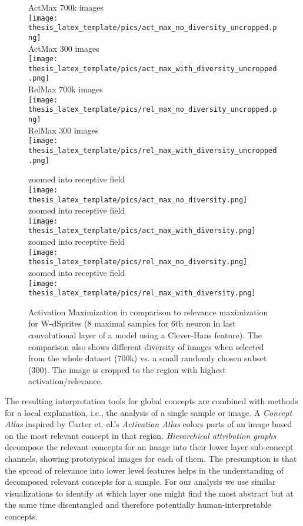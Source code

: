 \begin{figure}[t!]
\centering
\begin{minipage}{0.48\textwidth}
    ActMax 700k images \\
	\texttt{[image: thesis\_latex\_template/pics/act\_max\_no\_diversity\_uncropped.png]}\\
    ActMax 300 images \\
	\texttt{[image: thesis\_latex\_template/pics/act\_max\_with\_diversity\_uncropped.png]}\\
    RelMax 700k images\\
	\texttt{[image: thesis\_latex\_template/pics/rel\_max\_no\_diversity\_uncropped.png]}\\
    RelMax 300 images \\
	\texttt{[image: thesis\_latex\_template/pics/rel\_max\_with\_diversity\_uncropped.png]}
\end{minipage}
\begin{minipage}{0.48\textwidth}
    zoomed into receptive field \\
	\texttt{[image: thesis\_latex\_template/pics/act\_max\_no\_diversity.png]}\\
    zoomed into receptive field \\
	\texttt{[image: thesis\_latex\_template/pics/act\_max\_with\_diversity.png]}\\
    zoomed into receptive field \\
	\texttt{[image: thesis\_latex\_template/pics/rel\_max\_no\_diversity.png]}\\
    zoomed into receptive field \\
	\texttt{[image: thesis\_latex\_template/pics/rel\_max\_with\_diversity.png]}
\end{minipage}
\caption[ActMax vs. RelMax]{Activation Maximization in comparison to relevance maximization for W-dSprites (8 maximal samples for 6th neuron in last convolutional layer of a model using a Clever-Hans feature). The comparison also shows different diversity of images when selected from the whole dataset (700k) vs. a small randomly chosen subset (300). 
The image is cropped to the region with highest activation/relevance. }
\label{fig:act_rel_max}
\end{figure}

The resulting interpretation tools for global concepts are combined with methods for a local explanation, i.e., the analysis of a single sample or image. A \textit{Concept Atlas} inspired by Carter et. al.'s \textit{Activation Atlas} \cite{Carter2019} colors parts of an image based on the most relevant concept in that region. \textit{Hierarchical attribution graphs} decompose the relevant concepts for an image into their lower layer sub-concept channels, showing prototypical images for each of them. The presumption is that the spread of relevance into lower level features helps in the understanding of decomposed relevant concepts for a sample. For our analysis we use similar visualizations to identify at which layer one might find the most abstract but at the same time disentangled and therefore potentially human-interpretable concepts.

